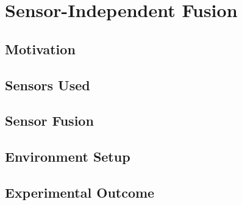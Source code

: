 \section{Sensor-Independent Fusion}

\subsection{Motivation}

\subsection{Sensors Used}

\subsection{Sensor Fusion}

\subsection{Environment Setup}

\subsection{Experimental Outcome}